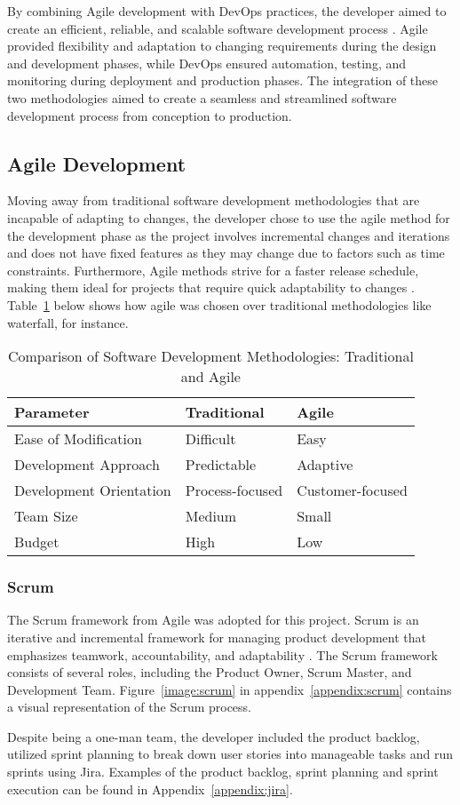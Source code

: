 By combining Agile development with DevOps practices, the developer aimed to create an efficient, reliable, and scalable software development process \cite{hlrf}. Agile provided flexibility and adaptation to changing requirements during the design and development phases, while DevOps ensured automation, testing, and monitoring during deployment and production phases. The integration of these two methodologies aimed to create a seamless and streamlined software development process from conception to production.

\subsection{Agile Development}
Moving away from traditional software development methodologies that are incapable of adapting to changes, the developer chose to use the agile method for the development phase as the project involves incremental changes and iterations and does not have fixed features as they may change due to factors such as time constraints. Furthermore, Agile methods strive for a faster release schedule, making them ideal for projects that require quick adaptability to changes \cite{aaa, hlrf, dragos, koch}. Table~\ref{tab:swmethod} below shows how agile was chosen over traditional methodologies like waterfall, for instance.

\begin{table}[ht]
    \centering
\begin{tabular}{|p{5cm}||p{3.5cm}||p{3.5cm}|}
\hline
\textbf{Parameter} & \textbf{Traditional} & \textbf{Agile} \\
\hline \hline
Ease of Modification  & Difficult & Easy \\
\hline
Development Approach  & Predictable  & Adaptive \\
\hline
Development Orientation  & Process-focused & Customer-focused \\
\hline
Team Size & Medium & Small \\
\hline
Budget & High & Low \\
\hline
\end{tabular}
\linebreak
    \caption{Comparison of Software Development Methodologies: Traditional and Agile \cite{aaa}}
    \label{tab:swmethod}
\end{table}

\subsubsection{Scrum}
The Scrum framework from Agile was adopted for this project. Scrum is an iterative and incremental framework for managing product development that emphasizes teamwork, accountability, and adaptability \cite{aaa, koch}. The Scrum framework consists of several roles, including the Product Owner, Scrum Master, and Development Team. Figure~\ref{image:scrum} in appendix~\ref{appendix:scrum} contains a visual representation of the Scrum process.

Despite being a one-man team, the developer included the product backlog, utilized sprint planning to break down user stories into manageable tasks and run sprints using Jira. Examples of the product backlog, sprint planning and sprint execution can be found in Appendix~\ref{appendix:jira}.
